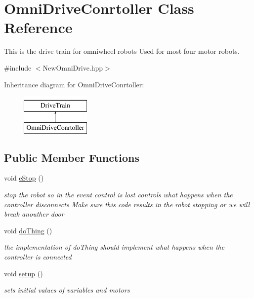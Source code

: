 \hypertarget{class_omni_drive_conrtoller}{}\section{Omni\+Drive\+Conrtoller Class Reference}
\label{class_omni_drive_conrtoller}


This is the drive train for omniwheel robots Used for most four motor robots.  




{\ttfamily \#include $<$New\+Omni\+Drive.\+hpp$>$}

Inheritance diagram for Omni\+Drive\+Conrtoller\+:\begin{figure}[H]
\begin{center}
\leavevmode
\includegraphics[height=2.000000cm]{class_omni_drive_conrtoller}
\end{center}
\end{figure}
\subsection*{Public Member Functions}
\begin{DoxyCompactItemize}
\item 
\mbox{\label{class_omni_drive_conrtoller_afa3633aa507f94725e2708e64812fc0d}} 
void \mbox{\hyperlink{class_omni_drive_conrtoller_afa3633aa507f94725e2708e64812fc0d}{e\+Stop}} ()
\begin{DoxyCompactList}\small\item\em stop the robot so in the event control is lost controls what happens when the controller disconnects Make sure this code results in the robot stopping or we will break anouther door \end{DoxyCompactList}\item 
\mbox{\label{class_omni_drive_conrtoller_a49df2da45a491575eaeed3ed08e6c06b}} 
void \mbox{\hyperlink{class_omni_drive_conrtoller_a49df2da45a491575eaeed3ed08e6c06b}{do\+Thing}} ()
\begin{DoxyCompactList}\small\item\em the implementation of do\+Thing should implement what happens when the controller is connected \end{DoxyCompactList}\item 
\mbox{\label{class_omni_drive_conrtoller_a5cc239719ab846de89fbb9709f7a65c2}} 
void \mbox{\hyperlink{class_omni_drive_conrtoller_a5cc239719ab846de89fbb9709f7a65c2}{setup}} ()
\begin{DoxyCompactList}\small\item\em sets initial values of variables and motors \end{DoxyCompactList}\end{DoxyCompactItemize}
